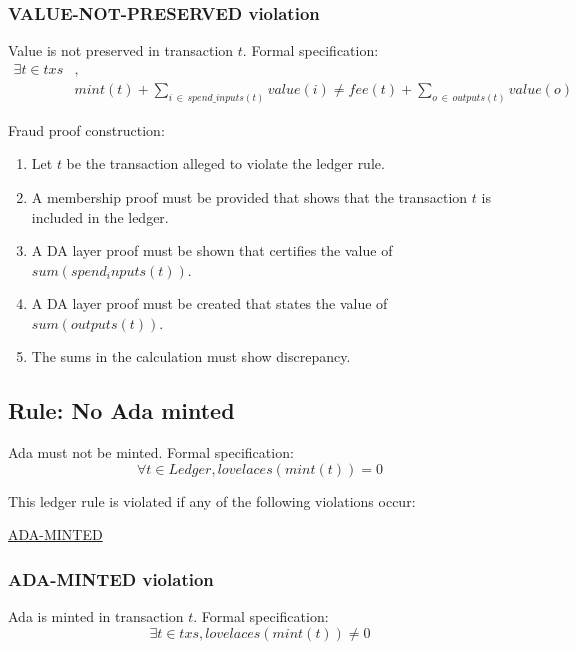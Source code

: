 \documentclass[../midgard.tex]{subfiles}
\begin{document}
\subsubsection{VALUE-NOT-PRESERVED violation}
\label{violation:VALUE-NOT-PRESERVED}
Value is not preserved in transaction $t$.
Formal specification:
\begin{equation*}
  \begin{split}
      \exists t \in txs &, \\
      & mint(t) + \sum_{i \, \in \, spend\_inputs(t)} value(i) \neq fee(t) + \sum_{o \, \in \, outputs(t)} value(o)
  \end{split}
  \end{equation*}

Fraud proof construction:
\begin{enumerate}
  \item Let $t$ be the transaction alleged to violate the ledger rule. 
  \item A membership proof must be provided that shows that the transaction $t$ is included in the ledger.
  \item A DA layer proof must be shown that certifies the value of $sum(spend_inputs(t))$.
  \item A DA layer proof must be created that states the value of $sum(outputs(t))$.
  \item The sums in the calculation must show discrepancy.
\end{enumerate}

\subsection{Rule: No Ada minted}
\label{rule:no-ada-minted}
Ada must not be minted.
Formal specification:
\begin{equation*}
    \forall t \in Ledger, lovelaces(mint(t)) = 0
\end{equation*}

This ledger rule is violated if any of the following violations occur:
\begin{itemize-multi}
  \item \hyperref[violation:ADA-MINTED]{ADA-MINTED}
\end{itemize-multi}

\subsubsection{ADA-MINTED violation}
\label{violation:ADA-MINTED}
Ada is minted in transaction $t$.
Formal specification:
\begin{equation*}
  \exists t \in txs, lovelaces(mint(t)) \neq 0
\end{equation*}
\end{document}
